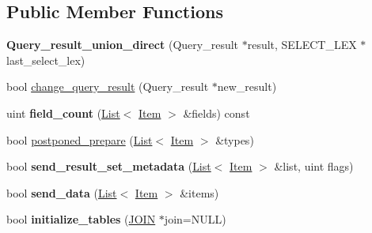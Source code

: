 \subsection*{Public Member Functions}
\begin{DoxyCompactItemize}
\item 
\mbox{\label{classQuery__result__union__direct_a2aefc9859a1d06b50ab622476d5906d8}} 
{\bfseries Query\+\_\+result\+\_\+union\+\_\+direct} (Query\+\_\+result $\ast$result, S\+E\+L\+E\+C\+T\+\_\+\+L\+EX $\ast$last\+\_\+select\+\_\+lex)
\item 
bool \mbox{\hyperlink{classQuery__result__union__direct_a22f70374a68909fb2a45d207639ca70a}{change\+\_\+query\+\_\+result}} (Query\+\_\+result $\ast$new\+\_\+result)
\item 
\mbox{\label{classQuery__result__union__direct_a3e5704d273740f0fa46be6db6ebf8125}} 
uint {\bfseries field\+\_\+count} (\mbox{\hyperlink{classList}{List}}$<$ \mbox{\hyperlink{classItem}{Item}} $>$ \&fields) const
\item 
bool \mbox{\hyperlink{classQuery__result__union__direct_af8c3f38e8a9597784871d3d9a6d5839a}{postponed\+\_\+prepare}} (\mbox{\hyperlink{classList}{List}}$<$ \mbox{\hyperlink{classItem}{Item}} $>$ \&types)
\item 
\mbox{\label{classQuery__result__union__direct_afd2a4d6955a6f05aea0996ee3f7b6c20}} 
bool {\bfseries send\+\_\+result\+\_\+set\+\_\+metadata} (\mbox{\hyperlink{classList}{List}}$<$ \mbox{\hyperlink{classItem}{Item}} $>$ \&list, uint flags)
\item 
\mbox{\label{classQuery__result__union__direct_a45ce2e83db9279abdea4d169912a769f}} 
bool {\bfseries send\+\_\+data} (\mbox{\hyperlink{classList}{List}}$<$ \mbox{\hyperlink{classItem}{Item}} $>$ \&items)
\item 
\mbox{\label{classQuery__result__union__direct_ab7feb1e533b778e2f924b02f786b0071}} 
bool {\bfseries initialize\+\_\+tables} (\mbox{\hyperlink{classJOIN}{J\+O\+IN}} $\ast$join=N\+U\+LL)
\item 
\mbox{\label{classQuery__result__union__direct_a79aba5f6553e9ed0a14d2ed0850101cd}} 

\end{DoxyCompactItemize}
